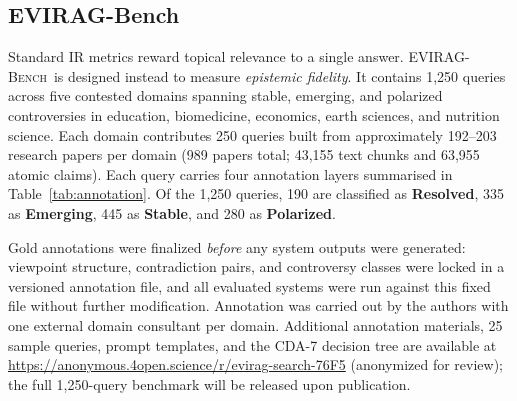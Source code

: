 \documentclass[11pt]{article}
\newcommand{\bench}{\textsc{EVIRAG-Bench}\xspace}
\begin{document}
\subsection{EVIRAG-Bench}\label{sec:bench}

Standard IR metrics reward topical relevance to a single answer.  \bench\ is
designed instead to measure \emph{epistemic fidelity}.  It contains 1,250 queries
across five contested domains spanning stable, emerging, and polarized
controversies in education, biomedicine, economics, earth sciences, and
nutrition science.  Each domain contributes 250 queries built from approximately 192--203 research
papers per domain (989 papers total; 43,155 text chunks and 63,955 atomic claims).
Each query carries four annotation layers summarised in
Table~\ref{tab:annotation}.  Of the 1,250 queries, 190 are classified as
\textbf{Resolved}, 335 as \textbf{Emerging}, 445 as \textbf{Stable}, and 280
as \textbf{Polarized}.

\begin{table}[t]
\centering\small
\setlength{\tabcolsep}{3pt}
%
\caption{Per-query annotation structure in \bench.  Annotations were
finalized and version-locked before any system was run, preventing
coupling between evaluation outcomes and annotation choices.}
\label{tab:annotation}
\end{table}

Gold annotations were finalized \emph{before} any system
outputs were generated: viewpoint structure, contradiction pairs, and
controversy classes were locked in a versioned annotation file, and all
evaluated systems were run against this fixed file without further modification.
Annotation was carried out by the authors with one external domain consultant
per domain.
Additional annotation materials, 25 sample queries, prompt templates, and the
CDA-7 decision tree are available at \url{https://anonymous.4open.science/r/evirag-search-76F5}
(anonymized for review); the full 1,250-query benchmark will be released upon publication.
\end{document}
